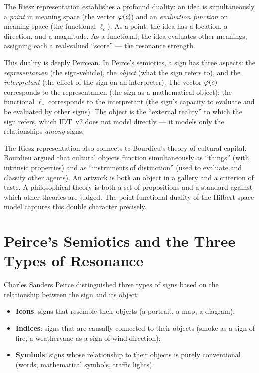 \begin{interpretation}
\label{interp:riesz}
The Riesz representation establishes a profound duality: an idea is
simultaneously a \emph{point} in meaning space (the vector $\varphi(c)$) and an
\emph{evaluation function} on meaning space (the functional $\ell_c$). As a
point, the idea has a location, a direction, and a magnitude. As a functional,
the idea evaluates other meanings, assigning each a real-valued ``score'' ---
the resonance strength.

This duality is deeply Peircean. In Peirce's semiotics, a sign has three
aspects: the \emph{representamen} (the sign-vehicle), the \emph{object} (what
the sign refers to), and the \emph{interpretant} (the effect of the sign on an
interpreter). The vector $\varphi(c)$ corresponds to the representamen (the sign
as a mathematical object); the functional $\ell_c$ corresponds to the
interpretant (the sign's capacity to evaluate and be evaluated by other signs).
The object is the ``external reality'' to which the sign refers, which IDT~v2
does not model directly --- it models only the relationships \emph{among} signs.

The Riesz representation also connects to Bourdieu's theory of cultural capital.
Bourdieu argued that cultural objects function simultaneously as ``things'' (with
intrinsic properties) and as ``instruments of distinction'' (used to evaluate
and classify other agents). An artwork is both an object in a gallery and a
criterion of taste. A philosophical theory is both a set of propositions and a
standard against which other theories are judged. The point-functional duality
of the Hilbert space model captures this double character precisely.
\end{interpretation}


\section{Peirce's Semiotics and the Three Types of Resonance}

Charles Sanders Peirce distinguished three types of signs based on the
relationship between the sign and its object:

\begin{itemize}
\item \textbf{Icons}: signs that resemble their objects (a portrait, a map, a
diagram);
\item \textbf{Indices}: signs that are causally connected to their objects
(smoke as a sign of fire, a weathervane as a sign of wind direction);
\item \textbf{Symbols}: signs whose relationship to their objects is purely
conventional (words, mathematical symbols, traffic lights).
\end{itemize}

